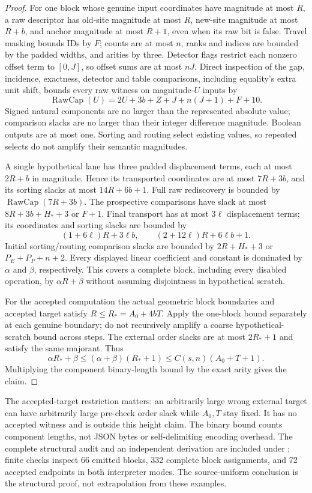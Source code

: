 \documentclass[11pt,a4paper]{article}
\numberwithin{equation}{section}
\newcommand{\file}[1]{\texttt{\detokenize{#1}}}
\begin{document}
\begin{proof}
For one block whose genuine input coordinates have magnitude at most $R$, a raw descriptor has old-site magnitude at most $R$, new-site magnitude at most $R+b$, and anchor magnitude at most $R+1$, even when its raw bit is false. Travel masking bounds IDs by $F$; counts are at most $n$, ranks and indices are bounded by the padded widths, and arities by three. Detector flags restrict each nonzero offset term to $[0,J]$, so offset sums are at most $nJ$. Direct inspection of the gap, incidence, exactness, detector and table comparisons, including equality's extra unit shift, bounds every raw witness on magnitude-$U$ inputs by
\[
\operatorname{RawCap}(U)=2U+3b+Z+J+n(J+1)+F+10.
\]
Signed natural components are no larger than the represented absolute value; comparison slacks are no larger than their integer difference magnitude. Boolean outputs are at most one. Sorting and routing select existing values, so repeated selects do not amplify their semantic magnitudes.

A single hypothetical lane has three padded displacement terms, each at most $2R+b$ in magnitude. Hence its transported coordinates are at most $7R+3b$, and its sorting slacks at most $14R+6b+1$. Full raw rediscovery is bounded by $\operatorname{RawCap}(7R+3b)$. The prospective comparisons have slack at most $8R+3b+H_*+3$ or $F+1$. Final transport has at most $3\ell$ displacement terms; its coordinates and sorting slacks are bounded by
\[
(1+6\ell)R+3\ell b,\qquad (2+12\ell)R+6\ell b+1.
\]
Initial sorting/routing comparison slacks are bounded by $2R+H_*+3$ or $P_E+P_P+n+2$. Every displayed linear coefficient and constant is dominated by $\alpha$ and $\beta$, respectively. This covers a complete block, including every disabled operation, by $\alpha R+\beta$ without assuming disjointness in hypothetical scratch.

For the accepted computation the actual geometric block boundaries and accepted target satisfy $R\le R_*=A_0+4bT$. Apply the one-block bound separately at each genuine boundary; do not recursively amplify a coarse hypothetical-scratch bound across steps. The external order slacks are at most $2R_*+1$ and satisfy the same majorant. Thus
\[
\alpha R_*+\beta\le(\alpha+\beta)(R_*+1)
\le C(s,n)(A_0+T+1).
\]
Multiplying the component binary-length bound by the exact arity gives the claim.
\end{proof}
The accepted-target restriction matters: an arbitrarily large wrong external target can have arbitrarily large pre-check order slack while $A_0,T$ stay fixed. It has no accepted witness and is outside this height claim. The binary bound counts component lengths, not JSON bytes or self-delimiting encoding overhead. The complete structural audit and an independent derivation are included under \file{bitbound/}; finite checks inspect 66 emitted blocks, 332 complete block assignments, and 72 accepted endpoints in both interpreter modes. The source-uniform conclusion is the structural proof, not extrapolation from these examples.
\end{document}
